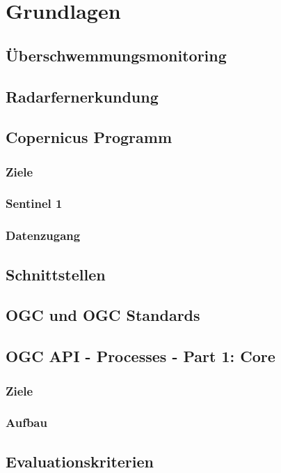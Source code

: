 \newpage
\restoregeometry
\section{Grundlagen}
\subsection{Überschwemmungsmonitoring}
\subsection{Radarfernerkundung}
\subsection{Copernicus Programm}
\subsubsection{Ziele}
\subsubsection{Sentinel 1}
\subsubsection{Datenzugang}
\subsection{Schnittstellen}
\subsection{OGC und OGC Standards}
\subsection{OGC API - Processes - Part 1: Core}
\subsubsection{Ziele}
\subsubsection{Aufbau}
\subsection{Evaluationskriterien}